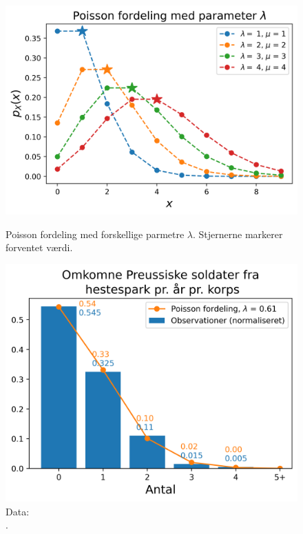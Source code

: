 \begin{figure}
\centering
\begin{minipage}[b][][b]{.45\textwidth}
\centering
\includegraphics[width = \textwidth]{poiss_dist.png}
\caption{Poisson fordeling med forskellige parmetre $\lambda$. Stjernerne markerer forventet værdi.} \label{fig:poiss}
\end{minipage}
\begin{minipage}[b][][b]{.45\textwidth}
\centering
\includegraphics[width = \textwidth]{poiss_example.png}
\caption{Data: \cite{horse}\\ {\color{white}.}} \label{fig:horse}
\end{minipage}
\end{figure}
